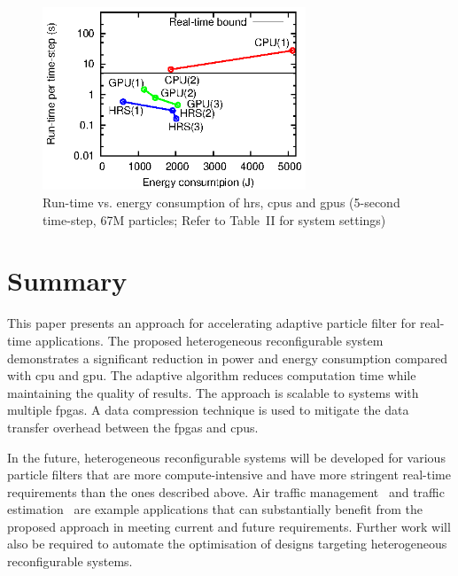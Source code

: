 \begin{figure}[t!]
\centering
\includegraphics[width=0.7\textwidth]{runtime_reconfiguration/figures/fig_scale}
\caption{Run-time vs. energy consumption of \gls{hrs}, \gls{cpu}s and \gls{gpu}s (5-second time-step, 67M particles; Refer to Table~II for system settings)}
\label{fig:scale}
\end{figure}


\section{Summary}

This paper presents an approach for accelerating adaptive particle filter for real-time applications.
The proposed heterogeneous reconfigurable system demonstrates a significant reduction in power and energy consumption compared with \gls{cpu} and \gls{gpu}.
The adaptive algorithm reduces computation time while maintaining the quality of results. 
The approach is scalable to systems with multiple \gls{fpga}s.
A data compression technique is used to mitigate the data transfer overhead between the \gls{fpga}s and \gls{cpu}s.

In the future, heterogeneous reconfigurable systems will be developed for various particle filters that are more compute-intensive and have more stringent real-time requirements than the ones described above.
Air traffic management~\cite{chau13b} and traffic estimation~\cite{mihaylova07} are example applications that can substantially benefit from the proposed approach in meeting current and future requirements.
Further work will also be required to automate the optimisation of designs targeting heterogeneous reconfigurable systems.



